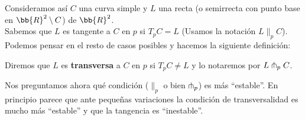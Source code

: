 Consideramos así $C$ una curva simple y $L$ una recta (o semirrecta con punto base en $\bb{R}^2 \setminus C$) de $\bb{R}^2$.\\

Sabemos que $L$ es tangente a $C$ en $p$ si $T_pC=L$ (Usamos la notación $L\|_p C$). Podemos pensar en el resto de casos posibles y hacemos la siguiente definición:

\begin{definicion}\label{def:transv_p}
    Diremos que $L$ es \textbf{transversa} a $C$ en $p$ si $T_pC \neq L$ y lo notaremos por $L\pitchfork_pC$.
\end{definicion}

Nos preguntamos ahora qué condición ($\|_p$ o bien $\pitchfork_p$) es más ``estable''. En principio parece que ante pequeñas variaciones la condición de transversalidad es mucho más ``estable'' y que la tangencia es ``inestable''.\\

